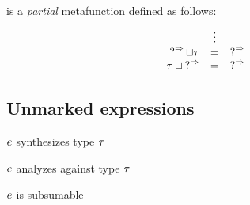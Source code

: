 \documentclass[formalism.tex]{subfiles}
\begin{document}
 is a \emph{partial} metafunction defined as follows:
%
\newcommand{\joinsToRow}[3]{\ensuremath{\TJoin{#1}{#2} & = & #3}}
\[\begin{array}{rcl}
  & \vdots & \\
  \joinsToRow{\TUnknownSwitch}{\TMV}{\TUnknownSwitch} \\
  \joinsToRow{\TMV}{\TUnknownSwitch}{\TUnknownSwitch}
\end{array}\]

\subsection{Unmarked expressions}
\label{sec:patterned-unmarked-expressions}
\judgbox{\ctxSynTypeU{\ctx}{\EMV}{\TMV}} $\EMV$ synthesizes type $\TMV$
%
\begin{mathpar}
\end{mathpar}

\judgbox{\ctxAnaTypeU{\ctx}{\EMV}{\TMV}} $\EMV$ analyzes against type $\TMV$
%
\begin{mathpar}

\end{mathpar}

\judgbox{\subsumable{\EMV}} $\EMV$ is subsumable
%
\begin{mathpar}
\end{mathpar}
\end{document}
